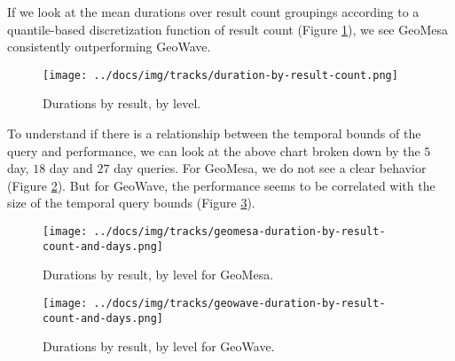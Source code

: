 If we look at the mean durations over result count groupings according to a quantile-based discretization function of result count
(Figure \ref{tracksdurationresult}),
we see GeoMesa consistently outperforming GeoWave.

\begin{figure}[h!tb]
  \centering
  \texttt{[image: ../docs/img/tracks/duration-by-result-count.png]}
  \caption{Durations by result, by level.}
  \label{tracksdurationresult}
\end{figure}

To understand if there is a relationship between the temporal bounds of the query and performance,
we can look at the above chart broken down by the $5$ day, $18$ day and $27$ day queries.
For GeoMesa, we do not see a clear behavior (Figure \ref{tracksgm2}).
But for GeoWave, the performance seems to be correlated with the size of the temporal query bounds (Figure \ref{tracksgw2}).

\begin{figure}[h!tb]
  \centering
  \texttt{[image: ../docs/img/tracks/geomesa-duration-by-result-count-and-days.png]}
  \caption{Durations by result, by level for GeoMesa.}
  \label{tracksgm2}
\end{figure}

\begin{figure}[h!tb]
  \centering
  \texttt{[image: ../docs/img/tracks/geowave-duration-by-result-count-and-days.png]}
  \caption{Durations by result, by level for GeoWave.}
  \label{tracksgw2}
\end{figure}
